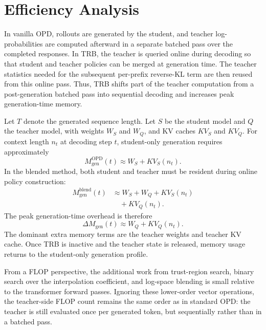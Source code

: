 \documentclass[11pt]{article}
\begin{document}
\section{Efficiency Analysis}
\label{app:efficiency}

In vanilla OPD, rollouts are generated by the student, and teacher log-probabilities are computed afterward in a separate batched pass over the completed responses.
In TRB, the teacher is queried online during decoding so that student and teacher policies can be merged at generation time.
The teacher statistics needed for the subsequent per-prefix reverse-KL term are then reused from this online pass.
Thus, TRB shifts part of the teacher computation from a post-generation batched pass into sequential decoding and increases peak generation-time memory.

Let $T$ denote the generated sequence length.
Let $S$ be the student model and $Q$ the teacher model, with weights $W_S$ and $W_Q$, and KV caches $KV_S$ and $KV_Q$.
For context length $n_t$ at decoding step $t$, student-only generation requires approximately
\begin{equation}
M_{\mathrm{gen}}^{\mathrm{OPD}}(t)
\approx
W_S + KV_S(n_t).
\end{equation}
In the blended method, both student and teacher must be resident during online policy construction:
\begin{equation}
\begin{aligned}
M_{\mathrm{gen}}^{\mathrm{blend}}(t)
&\approx
W_S + W_Q + KV_S(n_t)
\\
&\quad + KV_Q(n_t).
\end{aligned}
\end{equation}
The peak generation-time overhead is therefore
\begin{equation}
\Delta M_{\mathrm{gen}}(t)
\approx
W_Q + KV_Q(n_t).
\end{equation}
The dominant extra memory terms are the teacher weights and teacher KV cache.
Once TRB is inactive and the teacher state is released, memory usage returns to the student-only generation profile.

From a FLOP perspective, the additional work from trust-region search, binary search over the interpolation coefficient, and log-space blending is small relative to the transformer forward passes.
Ignoring these lower-order vector operations, the teacher-side FLOP count remains the same order as in standard OPD: the teacher is still evaluated once per generated token, but sequentially rather than in a batched pass.
\end{document}
